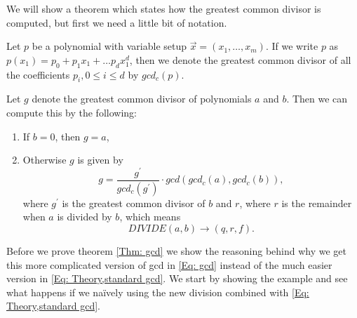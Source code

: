 We will show a theorem which states how the greatest common divisor is computed, but first we need a little bit of notation.
\begin{definition}
  Let $p$ be a polynomial with variable setup $\vec{x}=(x_1,\ldots,x_m)$. If we write $p$ as $p(x_1)=p_0+p_1x_1+\ldots p_dx_1^d$, then we denote the greatest common divisor of all the coefficients $p_i, 0\leq i\leq d$ by $gcd_c(p)$.
\end{definition}
\begin{theorem}\label{Thm: gcd}
  Let $g$ denote the greatest common divisor of polynomials $a$ and $b$. Then we can compute this by the following:
  \begin{enumerate}
    \item If $b=0$, then $g=a$,
    \item Otherwise $g$ is given by
    \begin{equation}\label{Eq: gcd}
      g=\frac{g^\prime}{gcd_c(g^\prime)}\cdot gcd(gcd_c(a),gcd_c(b)),
    \end{equation}
    where $g^\prime$ is the greatest common divisor of $b$ and $r$, where $r$ is the remainder when $a$ is divided by $b$, which means
    \begin{equation}
      DIVIDE(a,b) \rightarrow (q,r,f).
    \end{equation}
  \end{enumerate}
\end{theorem}
Before we prove theorem \ref{Thm: gcd} we show the reasoning behind why we get this more complicated version of gcd in \eqref{Eq: gcd} instead of the much easier version in \eqref{Eq: Theory,standard gcd}. We start by showing the example and see what happens if we naïvely using the new division combined with \eqref{Eq: Theory,standard gcd}.
